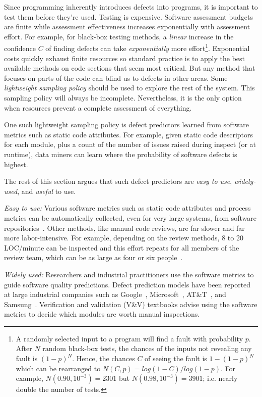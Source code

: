 Since programming inherently
introduces defects into  programs, it is important to test them before they're used.
Testing is expensive.
Software assessment budgets are finite
while assessment effectiveness increases 
exponentially with assessment effort.
For example, for  black-box testing methods,
a {\em linear} increase
in the confidence $C$ of finding  defects
can take {\em exponentially} more effort\footnote{A randomly selected 
input to a program will find a fault with probability $p$.
After $N$ random black-box tests, the chances of the inputs 
not revealing any fault 
is $(1-p)^N$. Hence, the chances $C$ of seeing the fault is $1-(1-p)^N$
which can be rearranged to 
 $N(C,p)=log(1 -
C)/log(1-p)$. For example, $N(0.90,10^{-3})=2301$
but $N(0.98,10^{-3})=3901$; i.e. nearly double the number of tests.}.
Exponential costs quickly exhaust finite resources so
standard practice is to apply the best
available  methods on code sections that seem most critical. 
But any method that focuses on parts of the code
can blind us to defects in other areas. Some  {\em lightweight sampling policy} should be used to explore the rest of the system.
This sampling policy will always be incomplete.
Nevertheless, it is the only option when
resources prevent a complete assessment of everything.

One such lightweight sampling policy is defect predictors learned from software metrics such as static code attributes.
For example, given static code descriptors for each module, plus a count of the number of issues raised during inspect (or at runtime),
data miners can learn where the probability of software defects is highest.


The rest of this section argues that such defect predictors are   {\em easy to
use}, {\em widely-used}, and {\em useful} to use.

{\em Easy to use:} Various software metrics such as static code attributes and process metrics can be automatically collected, even for very large systems, from software repositories~\cite{Basili96,Halstead77,McCabe76,nagappan05,Rahman13}.
Other methods, like  manual code reviews, are far slower and far more labor-intensive.
For example, depending on the review methods, 8 to 20 LOC/minute can be
inspected and this effort repeats for all members of the review team,
which can be as large as four or six people~\cite{me02f}. 

{\em Widely used:}  Researchers and industrial practitioners  use the software metrics to guide software 
quality predictions.
 Defect prediction models have been reported
  at large industrial companies such as Google~\cite{lewis13}, Microsoft~\cite{Nagappan06}, AT\&T~\cite{Ostrand05}, and Samsung~\cite{Kim15remi}.
Verification and validation (V\&V) textbooks
\cite{rakitin01} advise using the software metrics
to decide which modules are worth manual inspections. 


